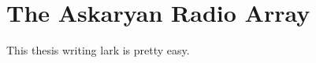 \chapter{The Askaryan Radio Array}
\label{chap:ara-detector}

This thesis writing lark is pretty easy.
